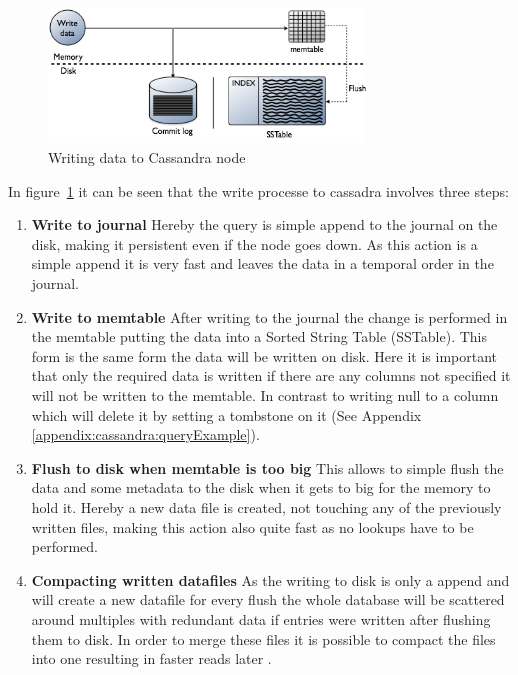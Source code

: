 \begin{figure}[ht]
    \centering
    \includegraphics[width=0.75\textwidth]{img/cassandra_local_write.png}
    \caption{Writing data to Cassandra node \autocite{datastaxWriteData}}
    \label{fig:cassandra:writeData}
\end{figure}
In figure~\ref{fig:cassandra:writeData} it can be seen that the write processe to cassadra involves three steps:
\begin{enumerate}
\item \textbf{Write to journal} Hereby the query is simple append to the journal on the disk, making it persistent even if the node goes down. As this action is a simple append it is very fast and leaves the data in a temporal order in the journal.
\item \textbf{Write to memtable} After writing to the journal the change is performed in the memtable putting the data into a Sorted String Table (SSTable). This form is the same form the data will be written on disk. Here it is important that only the required data is written if there are any columns not specified it will not be written to the memtable. In contrast to writing null to a column which will delete it by setting a tombstone on it (See Appendix \ref{appendix:cassandra:queryExample}).
\item \textbf{Flush to disk when memtable is too big} This allows to simple flush the data and some metadata to the disk when it gets to big for the memory to hold it. Hereby a new data file is created, not touching any of the previously written files, making this action also quite fast as no lookups have to be performed.
\item \textbf{Compacting written datafiles} As the writing to disk is only a append and will create a new datafile for every flush the whole database will be scattered around multiples with redundant data if entries were written after flushing them to disk. In order to merge these files it is possible to compact the files into one resulting in faster reads later \autocite{cassandraCompactTool}.
\end{enumerate}

